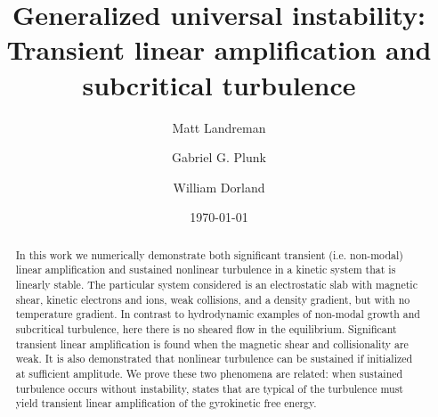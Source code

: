 \documentclass[12pt,superscriptaddress]{revtex4}
\begin{document}
\title{Generalized universal instability: Transient linear amplification and subcritical turbulence}




\author{Matt Landreman}
\author{Gabriel G. Plunk}
\author{William Dorland}


\date{\today}

\begin{abstract}

In this work we numerically demonstrate both significant transient (i.e. non-modal) linear amplification
and sustained nonlinear turbulence
in a kinetic system that is linearly stable.
The particular system considered is an electrostatic slab
with magnetic shear, kinetic electrons and ions,
weak collisions,
and a density gradient, but with no temperature gradient.
In contrast to hydrodynamic examples of non-modal growth and subcritical turbulence,
here there is no sheared flow in the equilibrium.
Significant transient linear amplification
is found when the magnetic shear and collisionality are weak.
It is also demonstrated that nonlinear turbulence can be sustained if initialized
at sufficient amplitude.
We prove these two phenomena are related:
when sustained turbulence occurs without instability,
states that are typical of the turbulence must
yield transient linear amplification of the gyrokinetic free energy.

\end{abstract}
\end{document}
